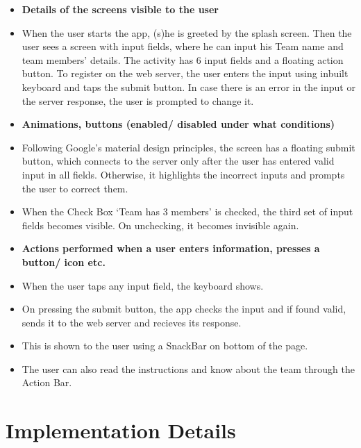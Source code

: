 \documentclass[12pt,a4paper,titlepage]{article}
\begin{document}
\begin{itemize}
	\item \textbf{Details of the screens visible to the user}
	\item[] When the user starts the app, (s)he is greeted by the splash screen. Then the user sees a screen with input fields, where he can input his Team name and team members' details. The activity has 6 input fields and a floating action button. To register on the web server, the user enters the input using inbuilt keyboard and taps the submit button. In case there is an error in the input or the server response, the user is prompted to change it.
	      
	\item \textbf{Animations, buttons (enabled/ disabled under what conditions)}
	\item[] Following Google's material design principles, the screen has a floating submit button, which connects to the server only after the user has entered valid input in all fields. Otherwise, it highlights the incorrect inputs and prompts the user to correct them.
	\item[] When the Check Box `Team has 3 members' is checked, the third set of input fields becomes visible. On unchecking, it becomes invisible again.
	\item \textbf{Actions performed when a user enters information, presses a button/ icon etc.}
	\item[] When the user taps any input field, the keyboard shows.
	\item[] On pressing the submit button, the app checks the input and if found valid, sends it to the web server and recieves its response.
	\item[] This is shown to the user using a SnackBar on bottom of the page.
	\item[] The user can also read the instructions and know about the team through the Action Bar.
\end{itemize}

\section{Implementation Details}
\end{document}
